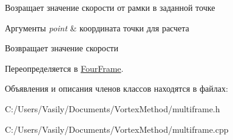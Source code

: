 Возращает значение скорости от рамки в заданной точке 
\begin{DoxyParams}{Аргументы}
{\em point} & координата точки для расчета \\
\hline
\end{DoxyParams}
\begin{DoxyReturn}{Возвращает}
значение скорости 
\end{DoxyReturn}


Переопределяется в \mbox{\hyperlink{class_four_frame_a0127ebf5b1fd643a590006afdf395e30}{Four\+Frame}}.



Объявления и описания членов классов находятся в файлах\+:\begin{DoxyCompactItemize}
\item 
C\+:/\+Users/\+Vasily/\+Documents/\+Vortex\+Method/multiframe.\+h\item 
C\+:/\+Users/\+Vasily/\+Documents/\+Vortex\+Method/multiframe.\+cpp\end{DoxyCompactItemize}
